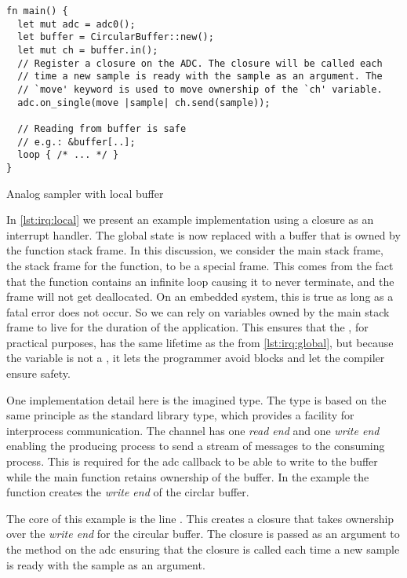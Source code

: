 \begin{listing}[H]
  \begin{verbatim}
fn main() {
  let mut adc = adc0();
  let buffer = CircularBuffer::new();
  let mut ch = buffer.in();
  // Register a closure on the ADC. The closure will be called each
  // time a new sample is ready with the sample as an argument. The
  // `move' keyword is used to move ownership of the `ch' variable.
  adc.on_single(move |sample| ch.send(sample));

  // Reading from buffer is safe
  // e.g.: &buffer[..];
  loop { /* ... */ }
}
  \end{verbatim}
  \caption{Analog sampler with local buffer}
  \label{lst:irq:local}
\end{listing}

In \autoref{lst:irq:local} we present an example implementation using a closure as an interrupt handler.
The global state is now replaced with a buffer that is owned by the  function stack frame.
In this discussion, we consider the main stack frame, the stack frame for the  function, to be a special frame.
This comes from the fact that the  function contains an infinite loop causing it to never terminate, and the frame will not get deallocated.
On an embedded system, this is true as long as a fatal error does not occur.
So we can rely on variables owned by the main stack frame to live for the duration of the application.
This ensures that the , for practical purposes, has the same lifetime as the  from \autoref{lst:irq:global}, but because the variable is not a , it lets the programmer avoid {\unsafe} blocks and let the compiler ensure safety.

One implementation detail here is the imagined  type.
The type is based on the same principle as the {\rust} standard library  type, which provides a facility for interprocess communication.
The channel has one \textit{read end} and one \textit{write end} enabling the producing process to send a stream of messages to the consuming process.
This is required for the \gls{adc} callback to be able to write to the buffer while the main function retains ownership of the buffer.
In the example the  function creates the \textit{write end} of the circlar buffer.

The core of this example is the line .
This creates a closure that takes ownership over the \textit{write end} for the circular buffer.
The closure is passed as an argument to the  method on the \gls{adc} ensuring that the closure is called each time a new sample is ready with the sample as an argument.

